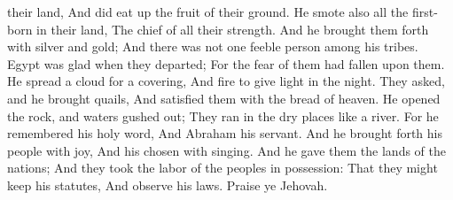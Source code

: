 their land, And did eat up the fruit of their ground.  He smote also all the first-born in their land, The chief of all their strength.  And he brought them forth with silver and gold; And there was not one feeble person among his tribes.  Egypt was glad when they departed; For the fear of them had fallen upon them.  He spread a cloud for a covering, And fire to give light in the night.  They asked, and he brought quails, And satisfied them with the bread of heaven.  He opened the rock, and waters gushed out; They ran in the dry places like a river.  For he remembered his holy word, And Abraham his servant.  And he brought forth his people with joy, And his chosen with singing.  And he gave them the lands of the nations; And they took the labor of the peoples in possession:  That they might keep his statutes, And observe his laws. Praise ye Jehovah. 

